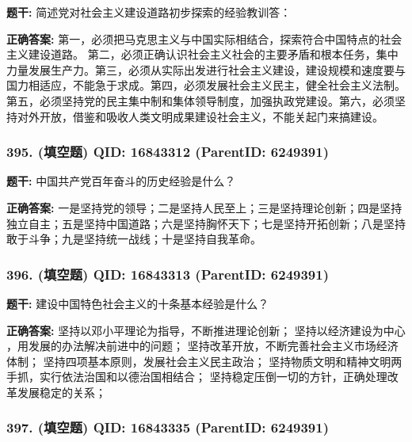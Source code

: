\documentclass[12pt,UTF8]{ctexart}
\begin{document}
\textbf{题干:}
简述党对社会主义建设道路初步探索的经验教训答：



\textbf{正确答案:}
第一，必须把马克思主义与中国实际相结合，探索符合中国特点的社会主义建设道路。
第二，必须正确认识社会主义社会的主要矛盾和根本任务，集中力量发展生产力。第三，必须从实际出发进行社会主义建设，建设规模和速度要与国力相适应，不能急于求成。第四，必须发展社会主义民主，健全社会主义法制。第五，必须坚持党的民主集中制和集体领导制度，加强执政党建设。第六，必须坚持对外开放，借鉴和吸收人类文明成果建设社会主义，不能关起门来搞建设。

\vspace{0.3em}\hrulefill\vspace{0.7em}

\subsubsection*{395. (填空题) \small QID: 16843312 (ParentID: 6249391)}

\textbf{题干:}
中国共产党百年奋斗的历史经验是什么？



\textbf{正确答案:}
一是坚持党的领导；二是坚持人民至上；三是坚持理论创新；四是坚持独立自主；五是坚持中国道路；六是坚持胸怀天下；七是坚持开拓创新；八是坚持敢于斗争；九是坚持统一战线；十是坚持自我革命。

\vspace{0.3em}\hrulefill\vspace{0.7em}

\subsubsection*{396. (填空题) \small QID: 16843313 (ParentID: 6249391)}

\textbf{题干:}
建设中国特色社会主义的十条基本经验是什么？



\textbf{正确答案:}
坚持以邓小平理论为指导，不断推进理论创新；
坚持以经济建设为中心 ，用发展的办法解决前进中的问题；
坚持改革开放，不断完善社会主义市场经济体制；
坚持四项基本原则，发展社会主义民主政治；
坚持物质文明和精神文明两手抓，实行依法治国和以德治国相结合；
坚持稳定压倒一切的方针，正确处理改革发展稳定的关系；

\vspace{0.3em}\hrulefill\vspace{0.7em}

\subsubsection*{397. (填空题) \small QID: 16843335 (ParentID: 6249391)}
\end{document}
